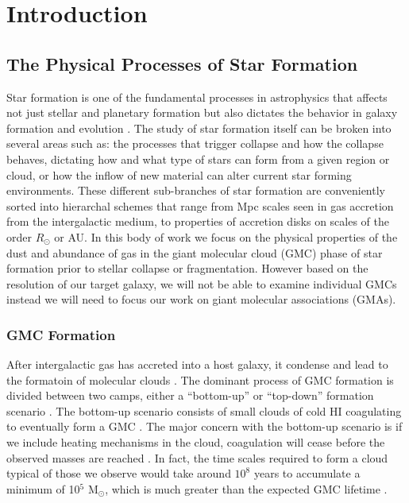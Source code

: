 \chapter{Introduction}\label{intro}

\section{The Physical Processes of Star Formation} %

Star formation is one of the fundamental processes in astrophysics that affects not just stellar and planetary formation but also dictates the behavior in galaxy formation and evolution \citep{kennicutt2012}.  The study of star formation itself can be broken into several areas such as: the processes that trigger collapse and how the collapse behaves, dictating how and what type of stars can form from a given region or cloud, or how the inflow of new material can alter current star forming environments.  These different sub-branches of star formation are conveniently sorted into hierarchal schemes that range from Mpc scales seen in gas accretion from the intergalactic medium, to properties of accretion disks on scales of the order $R_\odot$ or AU\citep{kennicutt2012}.  In this body of work we focus on the physical properties of the dust and abundance of gas in the giant molecular cloud (GMC) phase of star formation prior to stellar collapse or fragmentation.  However based on the resolution of our target galaxy, we will not be able to examine individual GMCs instead we will need to focus our work on giant molecular associations (GMAs).

\subsection{GMC Formation}

After intergalactic gas has accreted into a host galaxy, it condense and lead to the formatoin of molecular clouds \citep{kennicutt2012}.  The dominant process of GMC formation is divided between two camps, either a ``bottom-up'' or ``top-down'' formation scenario \citep{mckee2007}.  The bottom-up scenario consists of small clouds of cold HI coagulating to eventually form a GMC \citep{field1965, kwan1979}.  The major concern with the bottom-up scenario is if we include heating mechanisms in the cloud, coagulation will cease before the observed masses are reached \citep{mckee2007}.  In fact, the time scales required to form a cloud typical of those we observe would take around $10^8$ years to accumulate a minimum of 10$^5$ M$_\odot$, which is much greater than the expected GMC lifetime \citep{mckee2007}.  %

